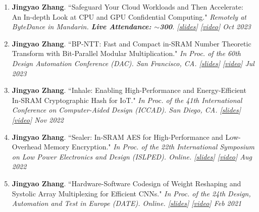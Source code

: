 \documentclass[letterpaper,11pt]{article}
\begin{document}
{{\begin{enumerate}
        \item \textbf{Jingyao Zhang}. ``Safeguard Your Cloud Workloads and Then Accelerate: An In-depth Look at CPU and GPU Confidential Computing." \textit{Remotely at ByteDance in Mandarin. \textbf{Live Attendance: $\sim$300}. \emph{[\href{https://jingyao-zhang.github.io/slides/ByteDance-Tech-Talk-Slides.pdf}{slides}] [\href{https://bytedance.feishu.cn/minutes/obcn35p3vg153yhg211a9jl8?from=auth_notice}{video}]}
        \hfill Oct 2023} \vspace{-2pt}
        \item \textbf{Jingyao Zhang}. ``BP-NTT: Fast and Compact in-SRAM Number Theoretic Transform with Bit-Parallel Modular Multiplication." \textit{In Proc. of the 60th Design Automation Conference (DAC). San Francisco, CA. 
        \emph{[\href{https://jingyao-zhang.github.io/slides/DAC-2023-Slides.pdf}{slides}]
        [\href{https://www.youtube.com/watch?v=iCul63P_v2E}{video}]}
        \hfill Jul 2023} \vspace{-2pt}
        \item \textbf{Jingyao Zhang}. ``Inhale: Enabling High-Performance and Energy-Efficient In-SRAM Cryptographic Hash for IoT." \textit{In Proc. of the 41th International Conference on Computer-Aided Design (ICCAD). San Diego, CA. 
        \emph{[\href{https://jingyao-zhang.github.io/slides/ICCAD-2022-Slides.pdf}{slides}]
        [\href{https://www.youtube.com/watch?v=e3KeH8AqGks}{video}]}
        \hfill Nov 2022} \vspace{-2pt}
        \item \textbf{Jingyao Zhang}. ``Sealer: In-SRAM AES for High-Performance and Low-Overhead Memory Encryption." \textit{In Proc. of the 22th International Symposium on Low Power Electronics and Design (ISLPED). Online.
        \emph{[\href{https://jingyao-zhang.github.io/slides/ISLPED-2022-Slides.pdf}{slides}]
        [\href{https://www.youtube.com/watch?v=mBx0Q7_Zk8c}{video}]}
        \hfill Aug 2022} \vspace{-2pt}
        \item \textbf{Jingyao Zhang}. ``Hardware-Software Codesign of Weight Reshaping and Systolic Array Multiplexing for Efficient CNNs." \textit{In Proc. of the 24th Design, Automation and Test in Europe (DATE). Online.
        \emph{[\href{https://jingyao-zhang.github.io/slides/DATE-2021-Slides.pdf}{slides}]
        [\href{https://www.youtube.com/watch?v=HiyUaztZrys}{video}]}
        \hfill Feb 2021} \vspace{-2pt}
        \end{enumerate}
        
}}
\end{document}
